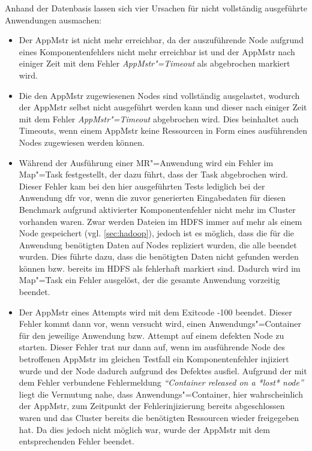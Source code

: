 Anhand der Datenbasis lassen sich vier Ursachen für nicht vollständig ausgeführte Anwendungen ausmachen:

\begin{itemize}
    \item
    Der \ac{AppMstr} ist nicht mehr erreichbar, da der auszuführende Node aufgrund eines Komponentenfehlers nicht mehr erreichbar ist und der \ac{AppMstr} nach einiger Zeit mit dem Fehler \emph{\ac{AppMstr}"=Timeout} als abgebrochen markiert wird.
    \item
    Die den \ac{AppMstr} zugewiesenen Nodes sind vollständig ausgelastet, wodurch der \ac{AppMstr} selbst nicht ausgeführt werden kann und dieser nach einiger Zeit mit dem Fehler \emph{\ac{AppMstr}"=Timeout} abgebrochen wird.
    Dies beinhaltet auch Timeouts, wenn einem \ac{AppMstr} keine Ressourcen in Form eines ausführenden Nodes zugewiesen werden können.
    \item
    Während der Ausführung einer \ac{MR}"=Anwendung wird ein Fehler im Map"=Task festgestellt, der dazu führt, dass der Task abgebrochen wird.
    Dieser Fehler kam bei den hier ausgeführten Tests lediglich bei der Anwendung \acl{dfr} vor, wenn die zuvor generierten Eingabedaten für diesen Benchmark aufgrund aktivierter Komponentenfehler nicht mehr im Cluster vorhanden waren.
    Zwar werden Dateien im \ac{HDFS} immer auf mehr als einem Node gespeichert (vgl. \autoref{sec:hadoop}), jedoch ist es möglich, dass die für die Anwendung benötigten Daten auf Nodes repliziert wurden, die alle beendet wurden.
    Dies führte dazu, dass die benötigten Daten nicht gefunden werden können bzw. bereits im \ac{HDFS} als fehlerhaft markiert sind.
    Dadurch wird im Map"=Task ein Fehler ausgelöst, der die gesamte Anwendung vorzeitig beendet.
    \item
    Der \ac{AppMstr} eines Attempts wird mit dem Exitcode -100 beendet.
    Dieser Fehler kommt dann vor, wenn versucht wird, einen Anwendungs"=Container für den jeweilige Anwendung bzw. Attempt auf einem defekten Node zu starten.
    Dieser Fehler trat nur dann auf, wenn im ausführende Node des betroffenen \ac{AppMstr} im gleichen Testfall ein Komponentenfehler injiziert wurde und der Node dadurch aufgrund des Defektes ausfiel.
    Aufgrund der mit dem Fehler verbundene Fehlermeldung \textit{\enquote{Container released on a *lost* node}} liegt die Vermutung nahe, dass Anwendungs"=Container, hier wahrscheinlich der \ac{AppMstr}, zum Zeitpunkt der Fehlerinjizierung bereits abgeschlossen waren und das Cluster bereits die benötigten Ressourcen wieder freigegeben hat.
    Da dies jedoch nicht möglich war, wurde der \ac{AppMstr} mit dem entsprechenden Fehler beendet.
    
\end{itemize}

